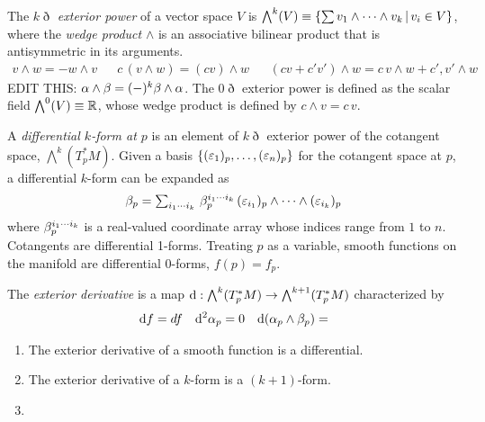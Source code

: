 \documentclass[11pt]{article}
\numberwithin{equation}{section}
\begin{document}
\begin{samepage}
\begin{dfn}
The \textit{$k\eth$ exterior power} of a vector space $V$ is $\bigwedge^k(V)\equiv\{\sum v_1\wedge\cdots\wedge v_k\,|\,v_i\in V\}$, where the \textit{wedge product} $\wedge$ is an associative bilinear product that is antisymmetric in its arguments.
\begin{align}
  v\wedge w
=
-
  w\wedge v
&&
  c\,(v\wedge w)
=
  (cv)\wedge w
&&
  (cv + c'v')\wedge w
=
  c\,v\wedge w
+
  c',v'\wedge w
\end{align}
EDIT THIS:
$
  \alpha  \wedge \beta 
=
  (-)^k \beta \wedge \alpha 
$.
The $0\eth$ exterior power is defined as the scalar field $\bigwedge^0(V)\equiv\mathbb{R}$, whose wedge product is defined by $c\wedge v=c\,v$.
\end{dfn}
\end{samepage}

\begin{dfn}
A \textit{differential $k$-form at $p$} is an element of $k\eth$ exterior power of the cotangent space, $\bigwedge^k(T_p^*M)$.
Given a basis  $\{(\varepsilon_1)_p, \ldots, (\varepsilon_n)_p\}$ for the  cotangent space at $p$, a differential $k$-form can be expanded as
\begin{align}
{\textstyle
  \ensuremath{\beta }_p
=
  \sum_{i_1\ensuremath{\cdots}i_k}\,
  \ensuremath{\beta }_p^{i_1\ensuremath{\cdots}i_k}
  \,
  (\ensuremath{\varepsilon}_{i_1})_p
  \wedge
  \ensuremath{\cdots}\wedge
  (\ensuremath{\varepsilon}_{i_k})_p
}
\end{align}
where $\beta _p^{i_1\cdots i_k}$ is a real-valued coordinate array whose indices range from $1$ to $n$.
Cotangents are differential 1-forms.
Treating $p$ as a variable, smooth functions on the manifold are differential $0$-forms, $f(p)=f_p$.
\end{dfn}

\begin{dfn}
The \textit{exterior derivative} is a map $\mathrm{d}:\bigwedge^k(T_p^*M)\rightarrow\bigwedge^{k+1}(T_p^*M)$ characterized by
\begin{align}
  \mathrm{d}f
=
  df
&&
  \mathrm{d}^2\alpha _p
=
  0
&&
  \mathrm{d}(\alpha _p\wedge\beta _p)
=
\end{align}
\begin{enumerate}
\item
  The exterior derivative of a smooth function is a differential.
\item
  The exterior derivative of a $k$-form is a $(k+1)$-form.
\item
  
\end{enumerate}
\end{dfn}
\end{document}
